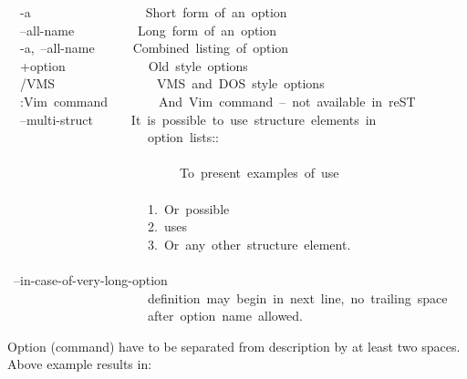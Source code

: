 \documentclass[12pt]{article}
\begin{document}
\begin{ttfamily}\begin{flushleft}
\mbox{~~-a~~~~~~~~~~~~~~~~~~Short~form~of~an~option}\\
\mbox{~~--all-name~~~~~~~~~~Long~form~of~an~option}\\
\mbox{~~-a,~--all-name~~~~~~Combined~listing~of~option}\\
\mbox{~~+option~~~~~~~~~~~~~Old~style~options}\\
\mbox{~~/VMS~~~~~~~~~~~~~~~~VMS~and~DOS~style~options}\\
\mbox{~~:Vim~command~~~~~~~~And~Vim~command~--~not~available~in~reST}\\
\mbox{~~--multi-struct~~~~~~It~is~possible~to~use~structure~elements~in}\\
\mbox{~~~~~~~~~~~~~~~~~~~~~~option~lists::}\\
\mbox{}\\
\mbox{~~~~~~~~~~~~~~~~~~~~~~~~~~~To~present~examples~of~use}\\
\mbox{}\\
\mbox{~~~~~~~~~~~~~~~~~~~~~~1.~Or~possible}\\
\mbox{~~~~~~~~~~~~~~~~~~~~~~2.~uses}\\
\mbox{~~~~~~~~~~~~~~~~~~~~~~3.~Or~any~other~structure~element.}\\
\mbox{}\\
\mbox{~--in-case-of-very-long-option}\\
\mbox{~~~~~~~~~~~~~~~~~~~~~~definition~may~begin~in~next~line,~no~trailing~space}\\
\mbox{~~~~~~~~~~~~~~~~~~~~~~after~option~name~allowed.}\\
\end{flushleft}\end{ttfamily}

Option (command) have to be separated from description by at least two
spaces. Above example results in:
\end{document}
